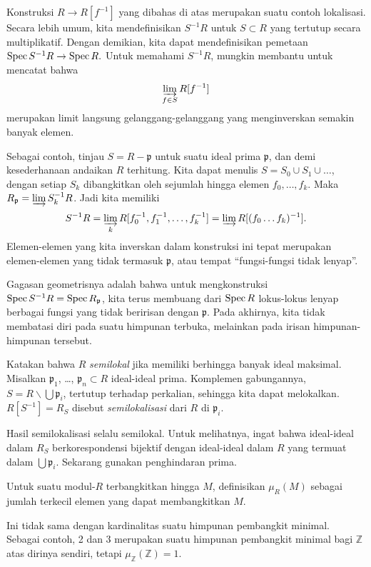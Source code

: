 \begin{remark} 
Konstruksi $R \to R[f^{-1}]$ yang dibahas di atas merupakan suatu
contoh
lokalisasi. Secara lebih umum, kita mendefinisikan $S^{-1}R$ untuk $S
\subset R$
yang tertutup secara multiplikatif. Dengan demikian, kita dapat mendefinisikan pemetaan
\( \operatorname{Spec} S^{-1}R \to \operatorname{Spec} R . \)
Untuk memahami $S^{-1}R$, mungkin membantu untuk mencatat bahwa
\[ \varinjlim_{f \in S} R[f^{-1}]  \]
merupakan limit langsung gelanggang-gelanggang yang menginverskan semakin banyak elemen.

Sebagai contoh, tinjau $S = R - \mathfrak{p}$ untuk suatu ideal prima
$\mathfrak{p}$, dan demi
kesederhanaan andaikan $R$ terhitung. Kita dapat menulis $S =
S_0 \cup S_1 \cup \dots$, dengan setiap $S_k$ dibangkitkan oleh
sejumlah hingga
elemen $f_0, \dots, f_k$. Maka $R_{\mathfrak{p}} = \varinjlim
S_k^{-1} R$.
Jadi kita memiliki
\[ S^{-1}R = \varinjlim_k R[f_0^{-1} , f_1^{-1}, \dots, f_k^{-1}
] = \varinjlim
R[(f_0\dots f_k)^{-1}]. \]
Elemen-elemen yang kita inverskan dalam konstruksi ini tepat merupakan elemen-elemen yang
tidak
termasuk $\mathfrak{p}$, atau tempat ``fungsi-fungsi tidak lenyap''.

Gagasan geometrisnya adalah
bahwa untuk mengkonstruksi $\operatorname{Spec} S^{-1}R = \operatorname{Spec} R_{\mathfrak{p}}$, kita
terus membuang
dari $\operatorname{Spec} R$ lokus-lokus lenyap berbagai fungsi yang
tidak
beririsan dengan $\mathfrak{p}$. Pada akhirnya, kita tidak membatasi diri pada suatu
himpunan terbuka, melainkan
pada irisan himpunan-himpunan tersebut.
\end{remark} 
\begin{exercise} \label{semilocal} 
Katakan bahwa $R$ \emph{semilokal} jika memiliki berhingga banyak ideal maksimal.
Misalkan $\mathfrak{p}_1$, \dots, $\mathfrak{p}_n\subset R$ ideal-ideal prima. Komplemen
gabungannya, $S=R\smallsetminus \bigcup \mathfrak{p}_i$, tertutup terhadap
perkalian, sehingga kita dapat
melokalkan. $R[S^{-1}] = R_S$ disebut \emph{semilokalisasi}
  dari $R$ di $\mathfrak{p}_i$.
 
Hasil semilokalisasi selalu semilokal. Untuk melihatnya, ingat bahwa
 ideal-ideal
 dalam $R_S$ berkorespondensi bijektif dengan ideal-ideal dalam $R$ yang termuat dalam $\bigcup
 \mathfrak{p}_i$. Sekarang gunakan penghindaran prima.
\end{exercise}

\begin{definition}
Untuk suatu modul-$R$ terbangkitkan hingga $M$, definisikan $\mu_R(M)$ sebagai jumlah terkecil
elemen
   yang dapat membangkitkan $M$.
 \end{definition}
Ini tidak sama dengan kardinalitas suatu himpunan pembangkit minimal. Sebagai
contoh, 2
dan 3 merupakan suatu himpunan pembangkit minimal bagi $\mathbb{Z}$ atas dirinya sendiri, tetapi
$\mu_\mathbb{Z} (\mathbb{Z}) =1$.

